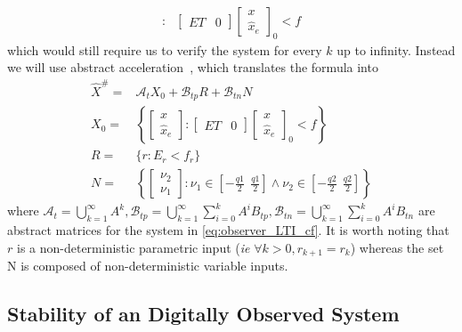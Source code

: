 \documentclass[twocolumn]{autart}    %
\newcommand{\mat}[1]{{#1}}
\renewcommand{\vec}[1]{{#1}}
\begin{document}
{\begin{align}
:&\left [\begin{array}{cc}\mat{E}\mat{T}&\mat{0}\end{array}\right] \left [\begin{array}{c}\vec{x}\\ \hat{\vec{x}}_e \end{array}\right]_0<\mat{f}
\end{align}
which would still require us to verify the system for every $k$ up to infinity. Instead we will use abstract acceleration~\cite{}, which translates the formula into
\begin{align}
\label{eq:aa_observer_LTI_cf}
\hat{X}^\#
=&\mathcal{A}_t X_0+\mathcal{B}_{tp} R + \mathcal{B}_{tn} N\\
X_0 =&\left \{ \left[\begin{array}{c}\vec{x}\\ \hat{\vec{x}}_e \end{array}\right] :
 \left [\begin{array}{cc}\mat{E}\mat{T}&\mat{0}\end{array}\right] \left [\begin{array}{c}\vec{x}\\ \hat{\vec{x}}_e \end{array}\right]_0<\mat{f} \right\}\nonumber\\
 R =&\{r : \mat{E}_r < \vec{f}_r \}\nonumber\\
 N=&\left \{ \left[\begin{array}{c}\vec{\nu}_2\\ \vec{\nu}_1\end{array}\right] : \nu_1 \in \left[-\frac{q1}{2}\ \ \frac{q1}{2}\right] \wedge \nu_2 \in \left[-\frac{q2}{2}\ \ \frac{q2}{2}\right]  \right \}\nonumber
\end{align}
%
where $\mathcal{A}_t=\bigcup_{k=1}^\infty \mat{A}^k,
\mathcal{B}_{tp}=\bigcup_{k=1}^\infty \sum_{i=0}^k\mat{A}^i\mat{B}_{tp},
\mathcal{B}_{tn}=\bigcup_{k=1}^\infty \sum_{i=0}^k\mat{A}^i\mat{B}_{tn}$ are
abstract matrices for the system in \eqref{eq:observer_LTI_cf}.  It is worth
noting that $r$ is a non-deterministic parametric input (\emph{ie} $\forall
k>0, r_{k+1} =r_k$) whereas the set N is composed of non-deterministic
variable inputs.

\subsection{Stability of an Digitally Observed System}\label{sec:cof_fwl_stability}

}
\end{document}
